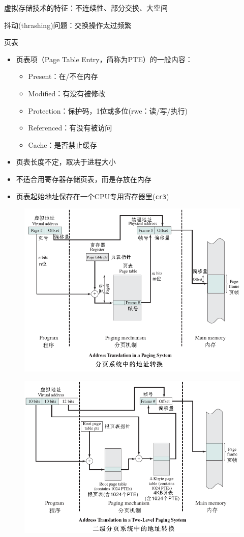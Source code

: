 虚拟存储技术的特征：不连续性、部分交换、大空间

抖动(thrashing)问题：交换操作太过频繁

页表
\begin{itemize}
\item 页表项（Page Table Entry，简称为PTE）的一般内容：
\begin{itemize}
\item Present：在/不在内存
\item Modified：有没有被修改
\item Protection：保护码，1位或多位(rwe：读/写/执行)
\item Referenced：有没有被访问
\item Cache：是否禁止缓存
\end{itemize}
\item 页表长度不定，取决于进程大小
\item 不适合用寄存器存储页表，而是存放在内存
\item 页表起始地址保存在一个CPU专用寄存器里(\verb'cr3')
\end{itemize}

\begin{figure}[H]
    \centering
    \includegraphics[width=0.8\linewidth]{fig/memory_address_transformation.png}
\end{figure}

\begin{figure}[H]
    \centering
    \includegraphics[width=0.8\linewidth]{fig/two-level_paging.png}
\end{figure}


